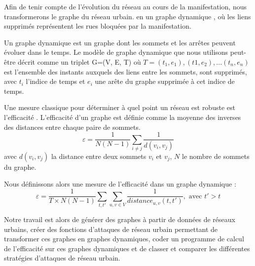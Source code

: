 Afin de tenir compte de l'évolution du réseau au cours de la manifestation, nous transformerons le graphe du réseau urbain.
en un graphe dynamique \cite{dynamic_graphs}, où les liens supprimés représentent les rues bloquées par la manifestation.

Un graphe dynamique est un graphe dont les sommets et les arrêtes peuvent évoluer dans le temps.
Le modèle de graphe dynamique que nous utilisons peut-être décrit comme un triplet G=(V, E, T) 
où $T={(t_1,e_1), (t1,e_2), ... (t_n,e_n)}$ est l'ensemble des instants auxquels des liens 
entre les sommets, sont supprimés, avec $t_i$ l'indice de temps et
$e_i$ une arête du graphe supprimée à cet indice de temps.

Une mesure classique pour déterminer à quel point un réseau est robuste est l'efficacité \cite{efficiency}.
L'efficacité d'un graphe est définie comme la moyenne des inverses des distances entre chaque paire de sommets.
\begin{equation}
\varepsilon = \frac{1}{N(N-1)} \sum_{i \neq j} \frac{1}{d(v_i, v_j)}
\end{equation}
avec $d(v_i, v_j)$ la distance entre deux sommets $v_i$ et $v_j$, $N$ le nombre de sommets du graphe.

Nous définissons alors une mesure de l'efficacité dans un graphe dynamique :
\begin{equation*}
\varepsilon = \frac{1}{T \times N(N-1)} \sum_{t,t'} \sum_{u,v \in V} \frac{1}{distance_{u,v}(t,t')}, \text{ avec } t' > t
\end{equation*}

Notre travail est alors de générer des graphes à partir de données de réseaux urbains, 
créer des fonctions d'attaques de réseau urbain permettant de transformer ces graphes en graphes dynamiques,
coder un programme de calcul de l'efficacité sur ces graphes dynamiques et de classer et comparer les 
différentes stratégies d'attaques de réseau urbain.